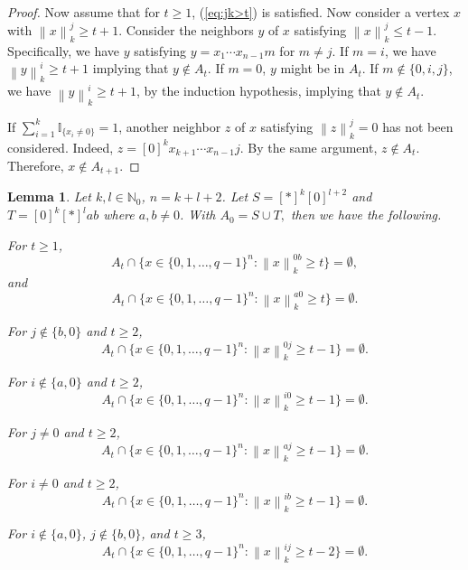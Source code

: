 \documentclass[reqno,11pt]{amsart}
\newtheorem{lemma}[theorem]{Lemma}
\renewcommand{\leq}{\leqslant}
\renewcommand{\geq}{\geqslant}
\begin{document}
\begin{proof}
Now assume that for $t \geq 1$, (\ref{eq:jk>t}) is satisfied. Now consider a vertex $x$ with $\left \lVert x \right \rVert_{k}^j \geq t+1$. Consider the neighbors $y$ of $x$ satisfying $\left \lVert x \right \rVert_{k}^j \leq t-1$. Specifically, we have $y$ satisfying $y=x_1\cdots x_{n-1}m$ for $m \neq j$. If $m=i$, we have $\left \lVert y \right \rVert_{k}^i \geq t+1$ implying that $y \notin A_t$. If $m=0$, $y$ might be in $A_t$. If $m \notin \{0,i,j\}$, we have $\left \lVert y \right \rVert_{k}^i \geq t+1$, by the induction hypothesis, implying that $y \notin A_t$. 

If $\sum_{i=1}^k\mathbb{I}_{\{x_i \neq 0\}} =1$, another neighbor $z$ of $x$ satisfying $\left \lVert z \right \rVert_{k}^j=0$ has not been considered. Indeed, $z=[0]^{k}x_{k+1}\cdots x_{n-1}j$. By the same argument, $z \notin A_t$. Therefore, $x \notin A_{t+1}$.
\end{proof}




\begin{lemma} \label{lemma:ST6}
Let $k,l \in \mathbb{N}_0$, $n=k+l+2$. Let $S=[*]^k[0]^{l+2}$ and $T=[0]^k[*]^lab$ where $a,b \neq 0$. With $A_0=S \cup T,$ then we have the following. 

For $t \geq 1$,
$$A_t \cap \{x \in \{0,1,\dots,q-1\}^n: \left \lVert x \right \rVert_k^{0b} \geq t\}=\emptyset,$$
and 
$$A_t \cap \{x \in \{0,1,\dots,q-1\}^n: \left \lVert x \right \rVert_k^{a0} \geq t\}=\emptyset.$$

For $j \notin \{b,0\}$ and $t \geq 2$,
$$A_t \cap \{x \in \{0,1,\dots,q-1\}^n: \left \lVert x \right \rVert_k^{0j} \geq t-1\}=\emptyset.$$

For $i \notin \{a,0\}$ and $t \geq 2$,
$$A_t \cap \{x \in \{0,1,\dots,q-1\}^n: \left \lVert x \right \rVert_k^{i0} \geq t-1\}=\emptyset.$$

For $j \neq 0$ and $t \geq 2$,
$$A_t \cap \{x \in \{0,1,\dots,q-1\}^n: \left \lVert x \right \rVert_k^{aj} \geq t-1\}=\emptyset.$$

For $i \neq 0$ and $t \geq 2$,
$$A_t \cap \{x \in \{0,1,\dots,q-1\}^n: \left \lVert x \right \rVert_k^{ib} \geq t-1\}=\emptyset.$$

For $i \notin \{a,0\}$, $j \notin \{b,0\}$, and $t \geq 3$, 
$$A_t \cap \{x \in \{0,1,\dots,q-1\}^n: \left \lVert x \right \rVert_k^{ij} \geq t-2\}=\emptyset.$$

\end{lemma}
\end{document}
